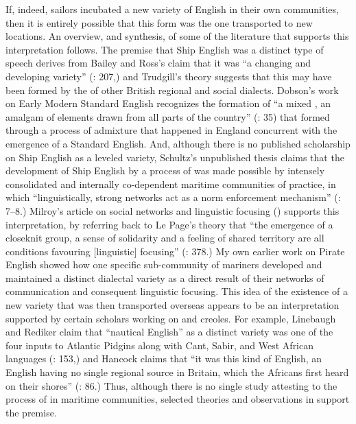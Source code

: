 If, indeed, sailors incubated a new variety of English in their own communities, then it is entirely possible that this form was the one transported to new locations. An overview, and synthesis, of some of the literature that supports this interpretation follows. The premise that Ship English was a distinct type of speech derives from Bailey and Ross’s claim that it was “a changing and developing variety” (\citeyear*{BaileyRoss1988}: 207,) and Trudgill’s theory suggests that this may have been formed by the  of other British regional and social dialects. Dobson’s work on Early Modern Standard English recognizes the formation of “a mixed , an amalgam of elements drawn from all parts of the country” (\citeyear{Dobson1955}: 35) that formed through a process of admixture that happened in England concurrent with the emergence of a Standard English. And, although there is no published scholarship on Ship English as a leveled variety, Schultz’s unpublished thesis claims that the development of Ship English by a process of   was made possible by intensely consolidated and internally co-dependent maritime communities of practice, in which “linguistically, strong networks act as a norm enforcement mechanism” (\citeyear{Schultz2010}: 7--8.) Milroy’s article on social networks and linguistic focusing (\citeyear*{Milroy1986}) supports this interpretation, by referring back to Le Page’s theory that “the emergence of a closeknit group, a sense of solidarity and a feeling of shared territory are all conditions favouring [linguistic] focusing” (\citeyear*{Milroy1986}: 378.) My own earlier work on Pirate English \citep{Delgado2013} showed how one specific sub-community of mariners developed and maintained a distinct dialectal variety as a direct result of their networks of communication and consequent linguistic focusing. This idea of the existence of a new variety that was then transported overseas appears to be an interpretation supported by certain scholars working on  and creoles.  For example, Linebaugh and Rediker claim that “nautical English” as a distinct variety was one of the four inputs to Atlantic Pidgins along with Cant, Sabir, and West African languages (\citeyear{LinebaughRediker2000}: 153,) and Hancock claims that “it was this kind of English, an English having no single regional source in Britain, which the Africans first heard on their shores” (\citeyear*{Haddock1986}: 86.) Thus, although there is no single study attesting to the process of  in maritime communities, selected theories and observations in  support the premise. 

